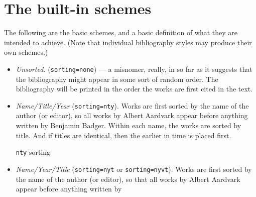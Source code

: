 \section{The built-in schemes}

The following are the basic schemes, and a
basic definition of what they are intended to achieve. (Note that
individual bibliography styles may produce their own schemes.)

\begin{itemize}
\item
  \emph{Unsorted.} (\texttt{sorting=none}) --- a misnomer, really, in so far as
  it suggests that the bibliography might appear in some sort of random
  order. The bibliography will be printed in the order the works are
  first cited in the text.
\item
  \emph{Name/Title/Year} (\texttt{sorting=nty}). Works are first sorted by the
  name of the author (or editor), so all works by Albert Aardvark appear
  before anything written by Benjamin Badger. Within each name, the
  works are sorted by title. And if titles are identical, then the
  earlier in time is placed first.
  \begin{marginfigure}[-20ex]
  \vspace{3pt}
  \caption{\texttt{nty} sorting}
  \end{marginfigure}
\item \emph{Name/Year/Title} (\texttt{sorting=nyt} or \texttt{sorting=nyvt}).
  Works are first sorted by the name of the author (or editor), so
  that all works by Albert Aardvark appear before anything written by

\end{itemize}
